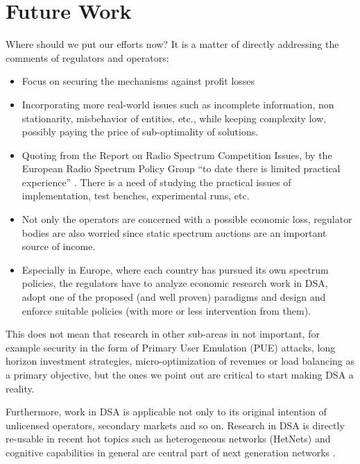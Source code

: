 \section{Future Work}
Where should we put our efforts now? It is a matter of directly addressing the comments of regulators and operators:
\begin{itemize}
\item Focus on securing the mechanisms against profit losses
\item Incorporating more real-world issues such as incomplete information, non stationarity, misbehavior of entities, etc., while keeping complexity low, possibly paying the price of sub-optimality of solutions. 
\item Quoting from the Report on Radio Spectrum Competition Issues, by the European Radio Spectrum Policy Group \enquote{to date there is limited practical experience} \cite{ref:RSPG2009}. There is a need of studying the practical issues of implementation, test benches, experimental runs, etc. 
\item Not only the operators are concerned with a possible economic loss, regulator bodies are also worried since static spectrum auctions are an important source of income. 
\item Especially in Europe, where each country has pursued its own spectrum policies, the regulators have to analyze economic research work in DSA, adopt one of the proposed (and well proven) paradigms and design and enforce suitable policies (with more or less intervention from them).
\end{itemize}
This does not mean that research in other sub-areas in not important, for example security in the form of Primary User Emulation (PUE) attacks, long horizon investment strategies, micro-optimization of revenues or load balancing as a primary objective, but the ones we point out are critical to start making DSA a reality. 

Furthermore, work in DSA is applicable not only to its original intention of unlicensed operators, secondary markets and so on. Research in DSA is directly re-usable in recent hot topics such as heterogeneous networks (HetNets) \cite{ref:Damnjanovic2011} and cognitive capabilities in general are central part of next generation networks \cite{ref:Andrews2014}.



